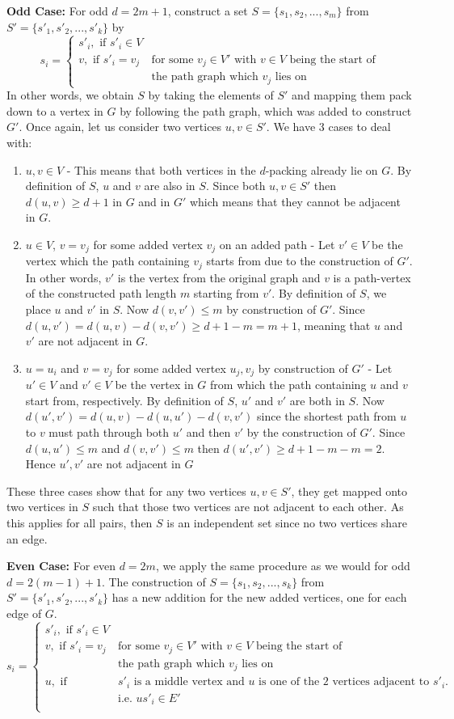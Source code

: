 \documentclass[10pt, a4paper]{article}
\theoremstyle{definition}
\newcommand{\n}{\\}
\begin{document}
\textbf{Odd Case:} For odd $d = 2m+1$, construct a set $S = \{s_1, s_2, ..., s_m\}$ from $S' = \{s'_1, s'_2, ... ,s'_k\}$ by
\[ s_i = \begin{cases}
	s'_i, \text{ if } s'_i \in V & \n
	v, \text{ if }  s'_i = v_j & \text{for some } v_j \in V' \text{ with $v \in V$ being the start of} \n & \text{the path graph which $v_j$ lies on}
\end{cases}\]
In other words, we obtain $S$ by taking the elements of $S'$ and mapping them pack down to a vertex in $G$ by following the path graph, which was added to construct $G'$. Once again, let us consider two vertices $u,v \in S'$. We have 3 cases to deal with:
\begin{enumerate}
	\item $u,v \in V$ - This means that both vertices in the $d$-packing already lie on $G$. By definition of $S$, $u$ and $v$ are also in $S$. Since both $u,v \in S'$ then $d(u,v) \geq d+1$ in $G$ and in $G'$ which means that they cannot be adjacent in $G$.
	\item $u \in V$, $v = v_j$ for some added vertex $v_j$ on an added path - Let $v' \in V$ be the vertex which the path containing $v_j$ starts from due to the construction of $G'$. In other words, $v'$ is the vertex from the original graph and $v$ is a path-vertex of the constructed path length $m$ starting from $v'$. By definition of $S$, we place $u$ and $v'$ in $S$. Now $d(v,v') \leq m$ by construction of $G'$. Since $d(u,v') = d(u,v) - d(v,v') \geq d + 1 - m = m + 1$, meaning that $u$ and $v'$ are not adjacent in $G$.
	\item $u = u_i$ and $v = v_j$ for some added vertex $u_j,v_j$ by construction of $G'$ -  Let $u' \in V$ and $v' \in V$ be the vertex in $G$ from which the path containing $u$ and $v$ start from, respectively. By definition of $S$, $u'$ and $v'$ are both in $S$. Now $d(u',v') = d(u,v) - d(u,u') - d(v,v')$ since the shortest path from $u$ to $v$ must path through both $u'$ and then $v'$ by the construction of $G'$. Since $d(u,u') \leq m$ and $d(v,v') \leq m$ then $d(u',v') \geq d + 1 - m - m = 2$. Hence $u', v'$ are not adjacent in $G$
\end{enumerate}
These three cases show that for any two vertices $u,v \in S'$, they get mapped onto two vertices in $S$ such that those two vertices are not adjacent to each other. As this applies for all pairs, then $S$ is an independent set since no two vertices share an edge.

\textbf{Even Case:} For even $d = 2m$, we apply the same procedure as we would for odd $d = 2(m-1) + 1$. The construction of $S = \{s_1,s_2,...,s_k\}$ from $S' = \{s'_1,s'_2,...,s'_k\}$ has a new addition for the new added vertices, one for each edge of $G$.
\[ s_i = \begin{cases}
	s'_i, \text{ if } s'_i \in V & \n
	v, \text{ if }  s'_i = v_j & \text{for some } v_j \in V' \text{ with $v \in V$ being the start of} \n & \text{the path graph which $v_j$ lies on} \n
	u, \text{ if } & s'_i \text{ is a middle vertex and $u$ is one of the 2 vertices adjacent to $s'_i$}. \n
	& \text{i.e. } us'_i \in E' \n
\end{cases}\]
\end{document}
